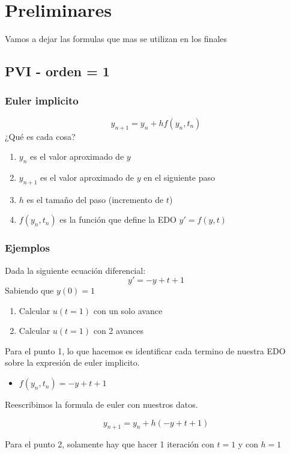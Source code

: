 \section{Preliminares}
Vamos a dejar las formulas que mas se utilizan en los finales 

\subsection{PVI - orden = 1}
\subsubsection{Euler implicito}
$$
    y_{n+1} = y_n + h  f(y_n, t_n)
$$
¿Qué es cada cosa?

 \begin{enumerate}
     \item {$y_n$} es el valor aproximado de $y$
     \item {$y_{n+1}$} es el valor aproximado de $y$ en el siguiente paso 
     \item {$h$} es el tamaño del paso (incremento de $t$) 
     \item {$f(y_n, t_n)$} es la función que define la EDO $y' = f(y,t)$
 \end{enumerate}


\subsubsection{Ejemplos}
Dada la siguiente ecuación diferencial: 
$$y' = -y + t +1$$
Sabiendo que $y(0) = 1$

\begin{enumerate}
    \item {Calcular $u(t=1)$ con un solo avance}
    \item {Calcular $u(t=1)$ con 2 avances}
\end{enumerate} 


Para el punto 1, lo que hacemos es identificar cada termino de nuestra EDO sobre la expresión de euler implicito. 

\begin{itemize}

    \item {$f(y_n, t_n) = -y + t + 1$}
\end{itemize}

Reescribimos la formula de euler con nuestros datos. 

$$ 
y_{n+1} = y_n + h  (-y + t + 1)
$$


Para el punto 2, solamente hay que hacer 1 iteración con $t = 1$ y con $h = 1$

